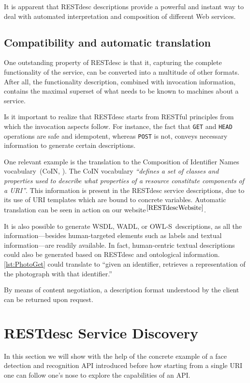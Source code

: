 \documentclass[smallextended]{svjour3}
\newcommand{\owls}{\mbox{OWL-S}}
\begin{document}
{It is apparent that RESTdesc descriptions provide a powerful and instant way to deal with automated interpretation and composition of different Web services.


\subsection{Compatibility and automatic translation}
One outstanding property of RESTdesc is that it, capturing the complete functionality of the service, can be converted into a multitude of other formats. After all, the functionality description, combined with invocation information, contains the maximal superset of what needs to be known to machines about a service.

Is it important to realize that RESTdesc starts from RESTful principles from which the invocation aspects follow. For instance, the fact that \Verb!GET! and \Verb!HEAD! operations are safe and idempotent, whereas \Verb!POST! is not, conveys necessary information to generate certain descriptions.

One relevant example is the translation to the Composition of Identifier Names vocabulary~(CoIN, \cite{CoIN}). The CoIN vocabulary \emph{``defines a set of classes and properties used to describe what properties of a resource constitute components of a URI''}. This information is present in the RESTdesc service descriptions, due to its use of URI templates which are bound to concrete variables. Automatic translation can be seen in action on our website$^{\ref{RESTdescWebsite}}$.

It is also possible to generate WSDL, WADL, or \owls\ descriptions, as all the information---besides human-targeted elements such as labels and textual information---are readily available. In fact, human-centric textual descriptions could also be generated based on RESTdesc and ontological information. \autoref{lst:PhotoGet} could translate to ``given an identifier, retrieves a representation of the photograph with that identifier.''

By means of content negotiation, a description format understood by the client can be returned upon request.

\section{RESTdesc Service Discovery} \label{sec:restdesc-discovery}
In this section we will show with the help of the concrete example of a face detection and recognition API introduced before how starting from a single URI one can follow one's nose to explore the capabilities of an API.

}
\end{document}
